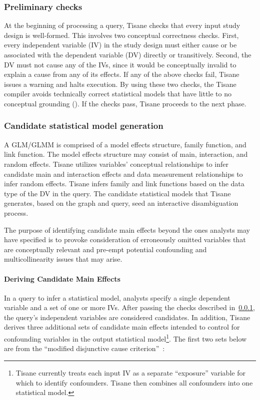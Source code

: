 \subsubsection{Preliminary checks} \label{sec:prelim-checks}
At the beginning of processing a query, Tisane checks that every input study
design is well-formed. This involves two conceptual correctness checks. First,
every independent variable (IV) in the study design must either cause or be
associated with the dependent variable (DV) directly or transitively. Second, the
DV must not cause any of the
IVs, since it would be conceptually invalid to explain a
cause from any of its effects. If any of the above checks fail, Tisane
issues a warning and halts execution. By using these two checks, the Tisane
compiler avoids technically correct statistical models that have little to no
conceptual grounding (\dcConceptualKnowledge). If the checks pass, Tisane proceeds to the next phase.

\subsubsection{Candidate statistical model generation}
A GLM/GLMM is comprised of a model effects structure, family function, and link
function. The model effects structure may consist of main, interaction, and
random effects. Tisane utilizes variables' conceptual relationships to infer candidate
main and interaction effects and data measurement relationships to infer
random effects. Tisane infers family and link functions based on the data type
of the DV in the query. The candidate statistical models that Tisane
generates, based on the graph and query, seed an interactive disambiguation
process.

The purpose of identifying candidate main effects beyond the ones analysts may
have specified is to provoke consideration of erroneously omitted variables that
are conceptually relevant and pre-empt potential confounding and
multicollinearity issues that may arise.

\paragraph{Deriving Candidate Main Effects}
In a query to infer a statistical model, analysts specify a single dependent
variable and a set of one or more IVs. After passing the checks described in~\ref{sec:prelim-checks}, %
the query's independent variables are considered candidates. In addition, Tisane
derives three additional sets of candidate main effects intended to control for
confounding variables in the output statistical model\footnote{Tisane currently
treats each input IV as a separate ``exposure'' variable for which to identify
confounders. Tisane then combines all confounders into one statistical model.}.
The first two sets below are from the ``modified disjunctive cause
criterion''~\cite{vanderweele2019modifiedDisjunctiveCriterion}:

